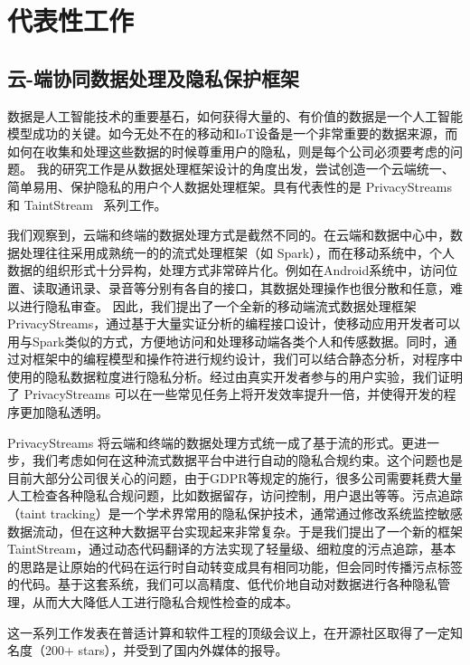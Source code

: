 \documentclass[12pt]{article}
\begin{document}
\section{代表性工作}

\subsection{云-端协同数据处理及隐私保护框架}

数据是人工智能技术的重要基石，如何获得大量的、有价值的数据是一个人工智能模型成功的关键。如今无处不在的移动和IoT设备是一个非常重要的数据来源，而如何在收集和处理这些数据的时候尊重用户的隐私，则是每个公司必须要考虑的问题。
我的研究工作是从数据处理框架设计的角度出发，尝试创造一个云端统一、简单易用、保护隐私的用户个人数据处理框架。具有代表性的是 PrivacyStreams~\cite{li2017privacystreams} 和 TaintStream~\cite{yang2021taintstream} 系列工作。

我们观察到，云端和终端的数据处理方式是截然不同的。在云端和数据中心中，数据处理往往采用成熟统一的的流式处理框架（如 Spark），而在移动系统中，个人数据的组织形式十分异构，处理方式非常碎片化。例如在Android系统中，访问位置、读取通讯录、录音等分别有各自的接口，其数据处理操作也很分散和任意，难以进行隐私审查。
因此，我们提出了一个全新的移动端流式数据处理框架 PrivacyStreams，通过基于大量实证分析的编程接口设计，使移动应用开发者可以用与Spark类似的方式，方便地访问和处理移动端各类个人和传感数据。同时，通过对框架中的编程模型和操作符进行规约设计，我们可以结合静态分析，对程序中使用的隐私数据粒度进行隐私分析。经过由真实开发者参与的用户实验，我们证明了 PrivacyStreams 可以在一些常见任务上将开发效率提升一倍，并使得开发的程序更加隐私透明。

PrivacyStreams 将云端和终端的数据处理方式统一成了基于流的形式。更进一步，我们考虑如何在这种流式数据平台中进行自动的隐私合规约束。这个问题也是目前大部分公司很关心的问题，由于GDPR等规定的施行，很多公司需要耗费大量人工检查各种隐私合规问题，比如数据留存，访问控制，用户退出等等。污点追踪（taint tracking）是一个学术界常用的隐私保护技术，通常通过修改系统监控敏感数据流动，但在这种大数据平台实现起来非常复杂。于是我们提出了一个新的框架 TaintStream，通过动态代码翻译的方法实现了轻量级、细粒度的污点追踪，基本的思路是让原始的代码在运行时自动转变成具有相同功能，但会同时传播污点标签的代码。基于这套系统，我们可以高精度、低代价地自动对数据进行各种隐私管理，从而大大降低人工进行隐私合规性检查的成本。

这一系列工作发表在普适计算和软件工程的顶级会议上，在开源社区取得了一定知名度（200+ stars）\cite{privacystreams:code}，并受到了国内外媒体的报导。
\end{document}
